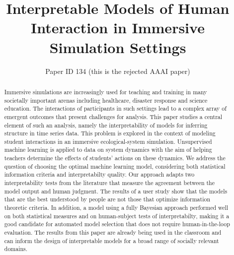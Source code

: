 \documentclass[letterpaper]{article} %
\title{Interpretable Models of Human Interaction in Immersive Simulation Settings}
\author{Paper ID 134 (this is the rejected AAAI paper)}
\begin{document}
\maketitle


\begin{abstract} 
Immersive simulations are increasingly used for teaching and training in many societally important arenas including healthcare, disaster response and science education.
The interactions of participants in such settings lead to a complex array of emergent  outcomes that present challenges for analysis. 
This paper studies a central element of such an analysis, namely the interpretability of models for inferring structure in time series data. 
This problem is explored in the context of modeling student interactions in an immersive ecological-system simulation. 
Unsupervised machine learning is applied to data on system dynamics with the aim of helping teachers determine the effects of students' actions on these dynamics. 
We address the question of choosing the optimal machine learning model, considering both statistical information criteria and interpretabilty quality. 
Our approach adapts two interpretability tests from the literature that measure the agreement between the model output and human judgment. 
The results of a user study show that the models that are  the best understood by  people are not those that optimize information theoretic criteria.
In addition, a model using a fully Bayesian approach performed well on both statistical measures and on human-subject tests of interpretabilty, making it a good candidate for automated model selection that does not require human-in-the-loop evaluation.
The results from this paper are already being used in the classroom and can inform the design of interpretable models for a broad range of socially relevant domains.
\end{abstract}
\end{document}
